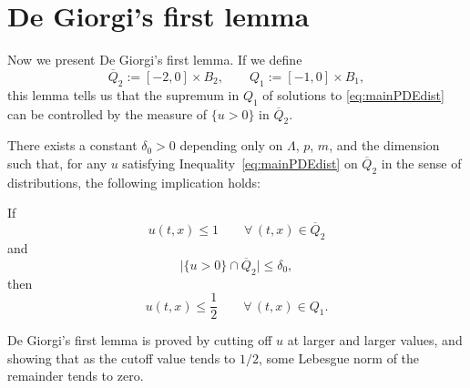 \section{De Giorgi's first lemma}\label{sec:DG1}

Now we present De Giorgi's first lemma.  
If we define
\[ \overline{Q}_2 := [-2,0]\times B_2, \qquad Q_1 := [-1,0]\times B_1,\]  
this lemma tells us that the supremum in $Q_1$ of solutions to \eqref{eq:mainPDEdist} can be controlled by the measure of $\{u > 0\}$ in $\overline{Q}_2$.  

\begin{proposition} \label{th:DG1}
There exists a constant $\delta_0 > 0$ depending only on $\Lambda$, $p$, $m$, and the dimension such that, for any $u$ satisfying Inequality~\eqref{eq:mainPDEdist} on $\overline{Q}_2$ in the sense of distributions, the following implication holds:

If 
\[ u(t,x) \leq 1 \qquad \forall\, (t,x) \in \overline{Q}_2 \]
and
\[ \big|\{u > 0\} \cap \overline{Q}_2 \big| \leq \delta_0,\] 
%
then 
\[ u(t,x) \leq \frac{1}{2} \qquad \forall \, (t,x) \in Q_1.\]


\end{proposition} 

De Giorgi's first lemma is proved by cutting off $u$ at larger and larger values, and showing that as the cutoff value tends to $1/2$, some Lebesgue norm of the remainder tends to zero.  

